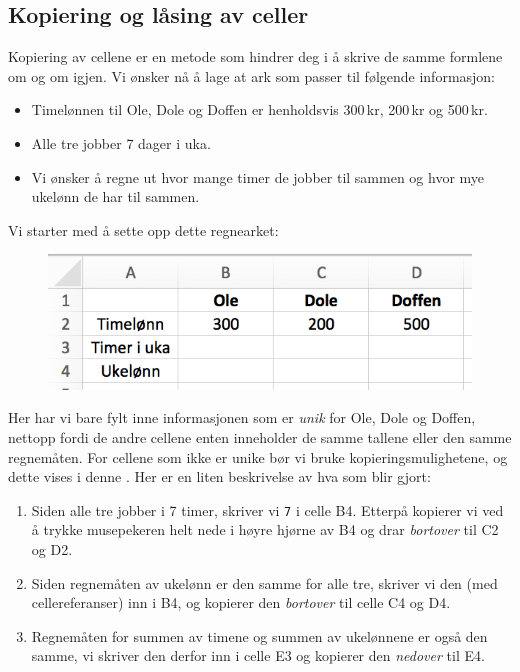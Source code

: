 \subsection{Kopiering og låsing av celler}
Kopiering av cellene er en metode som hindrer deg i å skrive de samme formlene om og om igjen. Vi ønsker nå å lage at ark som passer til følgende informasjon:
\begin{itemize}
	\item Timelønnen til Ole, Dole og Doffen er henholdsvis 300\,kr, 200\,kr og 500\,kr.
	\item Alle tre jobber 7 dager i uka.
	\item Vi ønsker å regne ut hvor mange timer de jobber til sammen og hvor mye ukelønn de har til sammen.
\end{itemize}

Vi starter med å sette opp dette regnearket:
\begin{figure}[H]
	\centering
	\includegraphics[scale=0.3]{figs/ex7}\qquad
\end{figure}
Her har vi bare fylt inne informasjonen som er \textit{unik} for Ole, Dole og Doffen, nettopp fordi de andre cellene enten inneholder de samme tallene eller den samme regnemåten. For cellene som ikke er unike bør vi bruke kopieringsmulighetene, og dette vises i denne . Her er en liten beskrivelse av hva som blir gjort:
\begin{enumerate}
	\item Siden alle tre jobber i 7 timer, skriver vi {\tt 7} i celle B4. Etterpå kopierer vi ved å trykke musepekeren helt nede i høyre hjørne av B4 og drar \textsl{bortover} til C2 og D2.
	\item Siden regnemåten av ukelønn er den samme for alle tre, skriver vi den (med cellereferanser) inn i B4, og kopierer den \textsl{bortover} til celle C4 og D4.
	\item Regnemåten for summen av timene og summen av ukelønnene er også den samme, vi skriver den derfor inn i celle E3 og kopierer den \textsl{nedover} til E4.
\end{enumerate}
